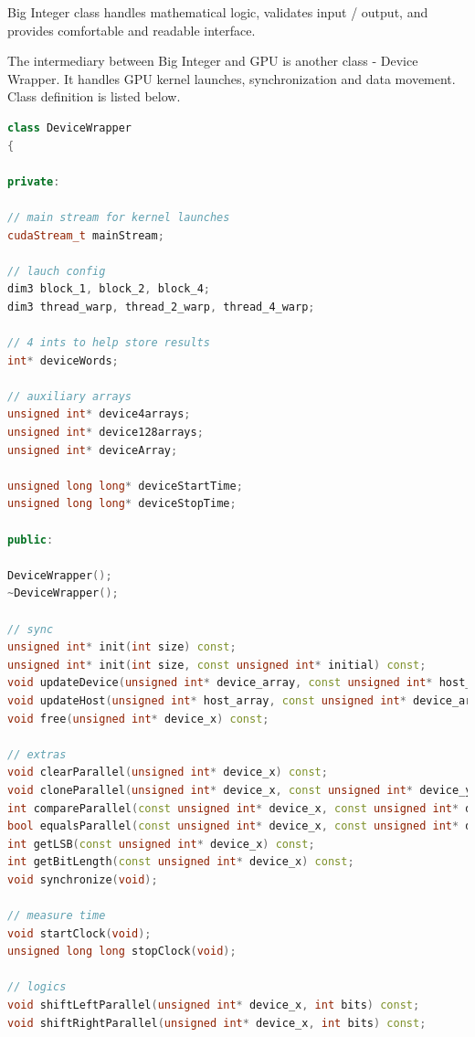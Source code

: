 \documentclass[oneside,openright,12pt,final,en]{mgr}
\begin{document}
Big Integer class handles mathematical logic, validates input / output, and provides comfortable and readable interface.

The intermediary between Big Integer and GPU is another class - Device Wrapper.
It handles GPU kernel launches, synchronization and data movement. Class definition is listed below.

\begin{lstlisting}[language=cpp,caption={DeviceWrapper.h}]
class DeviceWrapper
{

private:

// main stream for kernel launches
cudaStream_t mainStream;

// lauch config
dim3 block_1, block_2, block_4;
dim3 thread_warp, thread_2_warp, thread_4_warp;

// 4 ints to help store results
int* deviceWords;

// auxiliary arrays
unsigned int* device4arrays;
unsigned int* device128arrays;
unsigned int* deviceArray;

unsigned long long* deviceStartTime;
unsigned long long* deviceStopTime;

public:

DeviceWrapper();
~DeviceWrapper();

// sync
unsigned int* init(int size) const;
unsigned int* init(int size, const unsigned int* initial) const;
void updateDevice(unsigned int* device_array, const unsigned int* host_array, int size) const;
void updateHost(unsigned int* host_array, const unsigned int* device_array, int size) const;
void free(unsigned int* device_x) const;

// extras
void clearParallel(unsigned int* device_x) const;
void cloneParallel(unsigned int* device_x, const unsigned int* device_y) const;
int compareParallel(const unsigned int* device_x, const unsigned int* device_y) const;
bool equalsParallel(const unsigned int* device_x, const unsigned int* device_y) const;
int getLSB(const unsigned int* device_x) const;
int getBitLength(const unsigned int* device_x) const;
void synchronize(void);

// measure time
void startClock(void);
unsigned long long stopClock(void);

// logics
void shiftLeftParallel(unsigned int* device_x, int bits) const;
void shiftRightParallel(unsigned int* device_x, int bits) const;


\end{lstlisting}
\end{document}
